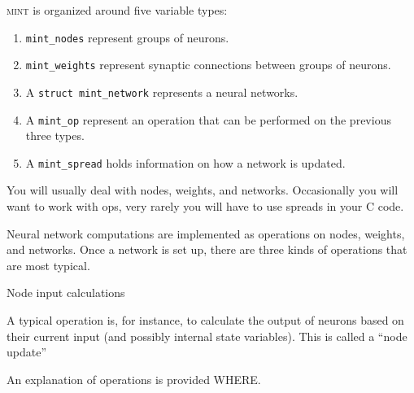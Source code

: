\documentclass[11pt,letterpaper]{memoir}
\newcommand{\mint}{{\scshape\sffamily mint}\xspace}
\begin{document}
\mint is organized around five variable types:
\begin{enumerate}
\item \lstinline{mint_nodes} represent groups of neurons.
\item \lstinline{mint_weights} represent synaptic connections between
  groups of neurons.
\item A \lstinline{struct mint_network} represents a neural networks.
\item A \lstinline{mint_op} represent an operation that can be
  performed on the previous three types.
\item A \lstinline{mint_spread} holds information on how a network is
  updated.
\end{enumerate}
You will usually deal with nodes, weights, and networks. Occasionally
you will want to work with ops, very rarely you will have to use
spreads in your C code.

Neural network computations are implemented as operations on nodes,
weights, and networks. Once a network is set up, there are three kinds
of operations that are most typical.
\begin{description}
\item[Node input calculations]  
\end{description}


A typical operation is, for instance, to
calculate the output of neurons based on their current input (and
possibly internal state variables). This is called a ``node update'' 

An explanation of operations is
provided WHERE.
\end{document}
